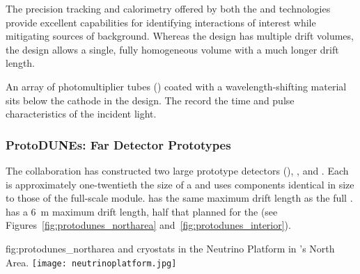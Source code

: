 The precision tracking and calorimetry offered by both the  and  technologies provide excellent capabilities for identifying interactions of interest while mitigating sources of background.  Whereas the  design has multiple drift volumes, the  design allows a single, fully homogeneous  volume with a much longer drift length.

An array of photomultiplier tubes () coated with a wavelength-shifting material sits below the cathode in the  design. The  record  the time and pulse characteristics of the incident light.



\FloatBarrier

\subsubsection{ProtoDUNEs: Far Detector Prototypes}

The  collaboration has constructed 
two large prototype detectors (), , and .  %
 Each is approximately one-twentieth the size of a   and uses components identical in size to those of the full-scale module.  has the same \spmaxdrift maximum drift length as the full .  has a \SI{6}{m} maximum drift length, half that planned for the  (see Figures~\ref{fig:protodunes_northarea} and~\ref{fig:protodunes_interior}).

\begin{dunefigure}
{fig:protodunes_northarea}
{ and  cryostats in the  Neutrino Platform in 's North Area.}
\texttt{[image: neutrinoplatform.jpg]}
\end{dunefigure}


